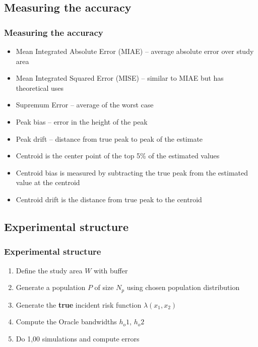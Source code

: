 \documentclass[notheorems]{beamer}
\theoremstyle{definition}
\theoremstyle{example}
\begin{document}
\subsection{Measuring the accuracy}
\begin{frame}\frametitle{Measuring the accuracy}
    \begin{itemize}
        \item Mean Integrated Absolute Error (MIAE) -- average absolute error over study area
        \item Mean Integrated Squared Error (MISE) -- similar to MIAE but has theoretical uses
        \item Supremum Error -- average of the worst case
        \item Peak bias -- error in the height of the peak
        \item Peak drift -- distance from true peak to peak of the estimate
        \item Centroid is the center point of the top 5\% of the estimated values
        \item Centroid bias is measured by subtracting the true peak from the estimated value at the centroid
        \item Centroid drift is the distance from true peak to the centroid
    \end{itemize}
\end{frame}

\subsection{Experimental structure}
\begin{frame}\frametitle{Experimental structure}
    \begin{enumerate}
        \item Define the study area $W$ with buffer
        \item Generate a population $P$ of size $N_p$ using chosen population distribution
        \item Generate the \textbf{true} incident risk function $\lambda(x_1, x_2)$
        \item Compute the Oracle bandwidths $h_o1$, $h_o2$
        \item Do 1,00 simulations and compute errors
    \end{enumerate}
\end{frame}

\end{document}
